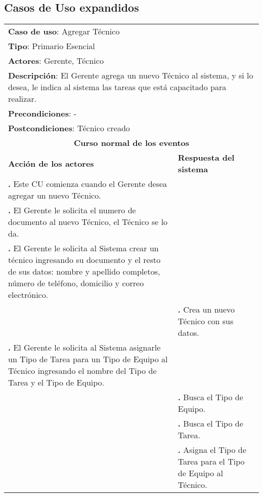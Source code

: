 \documentclass[12pt]{extarticle}
\begin{document}
    \subsection{Casos de Uso expandidos}

    \newcommand\inc{\stepcounter{step}\textbf{\thestep. }}
    \newcommand\resetinc{\setcounter{step}{0}}
    
    \newcommand\raya{\noindent\rule{169mm}{0.8mm}\\}

\begin{longtable}{ |p{8cm}|p{8cm}| }
    \hline
    \multicolumn{2}{|p{16cm}|}{\textbf{Caso de uso}: Agregar Técnico}\\
    \multicolumn{2}{|p{16cm}|}{\textbf{Tipo}: Primario Esencial}\\
    \multicolumn{2}{|p{16cm}|}{\textbf{Actores}: Gerente, Técnico}\\
    \multicolumn{2}{|p{16cm}|}{\textbf{Descripción}: El Gerente agrega un nuevo Técnico al sistema, y si lo desea, le indica al sistema las tareas que está capacitado para realizar.}\\
    \multicolumn{2}{|p{16cm}|}{\textbf{Precondiciones}: - }\\
    \multicolumn{2}{|p{16cm}|}{\textbf{Postcondiciones}: Técnico creado}\\
    \hline
    \multicolumn{2}{|c|}{\textbf{Curso normal de los eventos}}\\
    \hline
    \textbf{Acción de los actores} & \textbf{Respuesta del sistema}\\
    \hline
        \inc Este CU comienza cuando el Gerente desea agregar un nuevo Técnico.& \\
        \hline
        \inc  El Gerente le solicita el numero de documento al nuevo Técnico, el Técnico se lo da.&\\
        \hline
        \inc El Gerente le solicita al Sistema crear un técnico ingresando su documento y el resto de sus datos: nombre y apellido completos, número de teléfono, domicilio y correo electrónico. & \\
        \hline
        & \inc  Crea un nuevo Técnico con sus datos.\\
        \hline
        
        \inc El Gerente le solicita al Sistema asignarle un Tipo de Tarea para un Tipo de Equipo al Técnico ingresando el nombre del Tipo de Tarea y el Tipo de Equipo.& \\
        \hline
        & \inc Busca el Tipo de Equipo. \\
        \hline
        & \inc Busca el Tipo de Tarea. \\
        \hline
        & \inc Asigna el Tipo de Tarea para el Tipo de Equipo al Técnico.\\
        \hline


\end{longtable}
\end{document}
